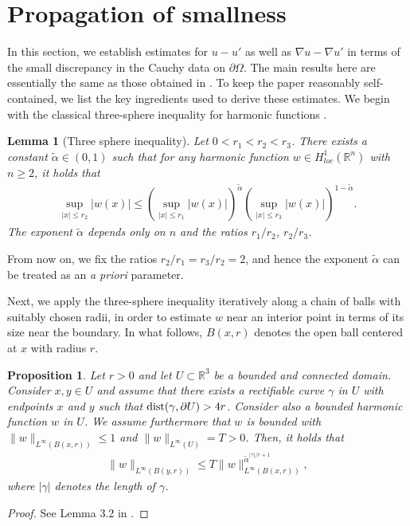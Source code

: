 ﻿\documentclass[11pt,reqno,oneside]{amsart}
\newtheorem{lemma}[theorem]{Lemma}
\newtheorem{proposition}[theorem]{Proposition}
\theoremstyle{definition}
\theoremstyle{remark}
\newcommand{\R}{\mathbb{R}}
\newcommand{\n}{\nabla}
\newcommand{\dist}{{\rm dist}}
\renewcommand{\a}{\alpha}
\newcommand{\g}{\gamma}
\newcommand{\p}{\partial}
\renewcommand{\O}{\Omega}
\begin{document}
    \section{Propagation of smallness}\label{sec:propa}

    In this section, we establish estimates for $u-u'$ as well as $\n u-\n u'$ in terms of the small discrepancy in the Cauchy data on $\p\O$. The main results here are essentially the same as those obtained in \cite{moi5}. To keep the paper reasonably self-contained, we list the key ingredients used to derive these estimates. We begin with the classical three-sphere inequality for harmonic functions \cite{Korevaar1994}.

    \begin{lemma}[Three sphere inequality]
        Let $0<r_1<r_2<r_3$. There exists a constant $\widetilde{\a}\in (0,1)$ such that for any harmonic function $w\in H^1_{loc}(\R^n)$ with $n\geq 2$, it holds that
        \begin{align*}
            \sup_{|x|\leq r_2}|w(x)|\leq \left(\sup_{|x|\leq r_1}|w(x)|\right)^{\widetilde{\a}}\left(\sup_{|x|\leq r_3}|w(x)|\right)^{1-\widetilde{\a}}.
        \end{align*}
        The exponent $\widetilde{\a}$ depends only on $n$ and the ratios $r_1/r_2$, $r_2/r_3$.
    \end{lemma}

    From now on, we fix the ratios $r_2/r_1=r_3/r_2=2$, and hence the exponent $\widetilde{\a}$ can be treated as an {\it a priori} parameter.

    \medskip

    Next, we apply the three-sphere inequality iteratively along a chain of balls with suitably chosen radii, in order to estimate $w$ near an interior point in terms of its size near the boundary. In what follows, $B(x,r)$ denotes the open ball centered at $x$ with radius $r$.

    \begin{proposition}\label{prop:p1}
        Let $r>0$ and let $U\subset \R^3$ be a bounded and connected domain. Consider $x,y\in U$ and assume that there exists a rectifiable curve $\g$ in $U$ with endpoints $x$ and $y$ such that $\dist(\g,\p U)>4r$. Consider also a bounded harmonic function $w$ in $U$. We assume furthermore that $w$ is bounded with $\|w\|_{L^\infty(B(x,r))}\leq 1$ and $\|w\|_{L^\infty(U)}= T>0$. Then, it holds that
        \begin{align*}
            \|w\|_{L^\infty(B(y,r))}\leq T \|w\|_{L^\infty(B(x,r))}^{\widetilde{\a}^{|\g|/r+1}},
        \end{align*}
        where $|\g|$ denotes the length of $\g$.
    \end{proposition}
    \begin{proof}
        See Lemma 3.2 in \cite{moi5}.
    \end{proof}
\end{document}
